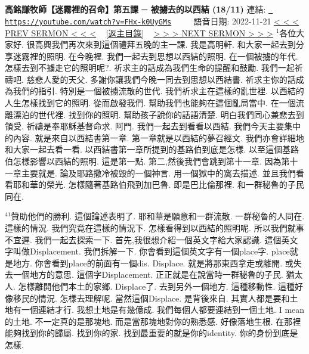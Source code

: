 \documentclass{book}
\begin{document}
\section{}
\label{sec:FHx_k0UyGMs}
\textbf{高銘謙牧師【迷霧裡的召命】第五課 ─ 被擄去的以西結 (18/11)}
\newline
\newline
連結: \href{https://youtube.com/watch?v=FHx-k0UyGMs}{\texttt{ https://youtube.com/watch?v=FHx-k0UyGMs}} ~~~~ 語音日期: 2022-11-21 
\newline
\newline
\hyperref[sec:djNxJ0pc_CU]{\small{< < < PREV SERMON < < <}}
~
\hyperref[sec:index]{\small{[返主目錄]}}
~
\hyperref[sec:P4IZ6PCS8no]{\small{> > > NEXT SERMON > > >}}
\newline
\newline
$^{1}$各位大家好.
很高興我們再次來到這個禮拜五晚的主一課.
我是高明軒.
和大家一起去到分享迷霧裡的照明.
在今晚裡.
我們一起去到思想以西結的照明.
在一個被擄的年代.
怎樣去到不擄走它的照明呢?.
祈求主的話成為我們生命的提醒和鼓勵.
我們一起祈禱吧.
慈悲人愛的天父.
多謝你讓我們今晚一同去到思想以西結書.
祈求主你的話成為我們的指引.
特別是一個被擄流散的世代.
我們祈求主在這樣的亂世裡.
以西結的人生怎樣找到它的照明.
從而啟發我們.
幫助我們也能夠在這個亂局當中.
在一個流離漂泊的世代裡.
找到你的照明.
幫助孩子說你的話語清楚.
明白我們同心兼悲去到領受.
祈禱是奉耶穌基督命求.
阿門.
我們一起去到看看以西結.
我們今天主要集中的內容.
就是來自以西結書第一章.
第一章就是以西結的夢召經文.
我們亦會詳細地和大家一起去看一看.
以西結書第一章所提到的基路伯到底是怎樣.
以至這個基路伯怎樣影響以西結的照明.
這是第一點.
第二,然後我們會跳到第十一章.
因為第十一章主要就是.
論及耶路撒冷被毀的一個神言.
用一個獄中的窩去描述.
並且我們看看耶和華的榮光.
怎樣隨著基路伯飛到加巴魯.
即是巴比倫那裡.
和一群秘魯的子民同在.

$^{41}$贊助他們的勝利.
這個論述表明了.
耶和華是願意和一群流散.
一群秘魯的人同在.
這樣的情況.
我們究竟在這樣的情況下.
怎樣看得到以西結的照明呢.
所以我們就事不宜遲.
我們一起去探索一下.
首先,我很想介紹一個英文字給大家認識.
這個英文字叫做Displacement.
我們拆解一下.
你會看到這個英文字有一個place字.
place就是地方.
你會看到place的前面有一個dis.
Displace.
就是將那東西拿走或離開.
或失去一個地方的意思.
這個字Displacement.
正正就是在說當時一群秘魯的子民.
猶太人.
怎樣離開他們本土的家鄉.
Displace了.
去到另外一個地方.
這種移動性.
這種好像移民的情況.
怎樣去理解呢.
當然這個Displace.
是背後來自.
其實人都是要和土地有一個連結才行.
我想土地是有幾億成.
我們每個人都要連結到一個土地.
I mean的土地.
不一定真的是那塊地.
而是當那塊地對你的熟悉感.
好像落地生根.
在那裡能夠找到你的歸屬.
找到你的家.
找到最重要的就是你的identity.
你的身份到底是怎樣.
\end{document}
